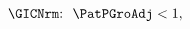  \begin{align}
\text{{\GICNrm}:~~}    \PatPGroAdj  & < 1, \phantom{\text{{\GICNrm}:~~}}\label{eq:GICNrm}
  \end{align}
